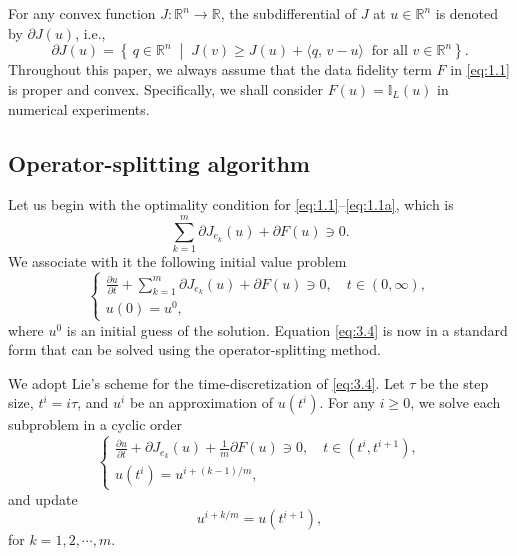\documentclass{article}
\theoremstyle{definition}
\begin{document}
For any convex function $J:\mathbb{R}^n\rightarrow \mathbb{R}$, the subdifferential of $J$ at $u\in\mathbb{R}^n$ is denoted by $\partial J(u)$, i.e.,
\[
\partial J(u)= \left\{\, q \in \mathbb{R}^n \;\middle|\;
J(v) \geq J(u) + \langle q,\, v-u \rangle \;\; \text{for all } v \in \mathbb{R}^n \right\}.
\]
Throughout this paper, we always assume that the data fidelity term $F$ in \eqref{eq:1.1} is proper and convex.
Specifically, we shall consider $F(u)=\mathbb{I}_L(u)$ in numerical experiments.



\subsection{Operator-splitting algorithm}
Let us begin with the optimality condition for \eqref{eq:1.1}--\eqref{eq:1.1a}, which is
 \begin{equation*}%
   \sum_{k=1}^m\partial J_{e_k}(u)+\partial F(u)\ni 0.
 \end{equation*}
 We associate with it the following initial value problem
 \begin{equation}\label{eq:3.4}
   \begin{cases}
   \frac{\partial u}{\partial t}+\sum_{k=1}^m\partial J_{e_k}(u)+\partial F(u)\ni 0,\quad t\in(0,\infty),\\
   u(0)=u^{0},
   \end{cases}
 \end{equation}
 where $u^{0}$ is an initial guess of the solution.
 Equation \eqref{eq:3.4} is now in a standard form that can be solved using the operator-splitting method.


 We adopt Lie's scheme \cite{glowinski2016some} for the time-discretization of \eqref{eq:3.4}.
 Let $\tau$ be the step size, $t^i=i\tau$, and $u^i$ be an approximation of $u(t^i)$.
 For any $i\geq 0$, we solve each subproblem in a cyclic order
 \begin{equation}\label{eq:3.5}
   \begin{cases}
   \frac{\partial u}{\partial t}+\partial J_{e_k}(u)+\frac{1}{m}\partial F(u)\ni 0,\quad t\in(t^i,t^{i+1}),\\
   u(t^i)=u^{i+(k-1)/m},
   \end{cases}
 \end{equation}
 and update
 \begin{equation*}
   u^{i+k/m}=u(t^{i+1}),
 \end{equation*}
 for $k = 1,2,\cdots, m$.
\end{document}

